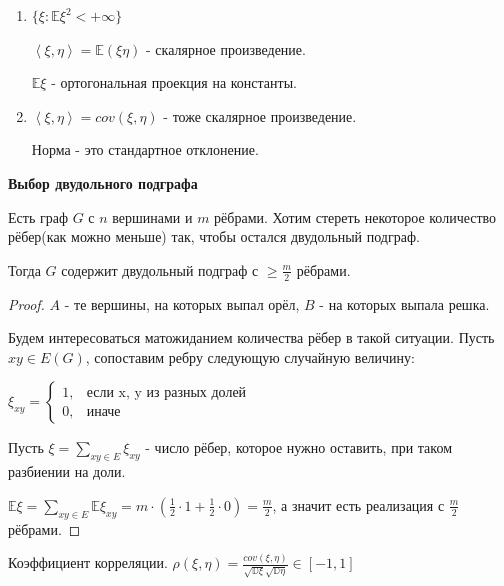 \begin{remark}
    \begin{enumerate}
        \item {
            $\{ \xi : \mathbb{E} \xi^2 < +\infty \}$

            $\left <\xi, \eta \right > = \mathbb{E} (\xi \eta)$ - скалярное произведение.

            $\mathbb{E} \xi$ - ортогональная проекция на константы.
        }
        \item {
            $\left < \xi, \eta \right > = cov (\xi, \eta)$ - тоже скалярное произведение.

            Норма - это стандартное отклонение.
        }
    \end{enumerate}
\end{remark}

\begin{theorem}
    \textbf{Выбор двудольного подграфа}

    Есть граф $G$ с $n$ вершинами и $m$ рёбрами. Хотим стереть некоторое количество рёбер(как можно меньше) так, чтобы
    остался двудольный подграф.

    Тогда $G$ содержит двудольный подграф с $\geqslant \frac{m}{2}$ рёбрами.
\end{theorem}

\begin{proof}
    $A$ - те вершины, на которых выпал орёл, $B$ - на которых выпала решка.

    Будем интересоваться матожиданием количества рёбер в такой ситуации. Пусть $xy \in E(G)$, сопоставим ребру 
    следующую случайную величину:

    $
    \xi_{xy} = 
    \begin{cases}
        1, & \text{если x, y из разных долей} \\
        0, & \text{иначе}
    \end{cases}
    $

    Пусть $\xi = \sum_{xy \in E} \xi_{xy}$ - число рёбер, которое нужно оставить, при таком разбиении на доли.

    $\mathbb{E} \xi = \sum_{xy \in E} \mathbb{E} \xi_{xy} = m \cdot (\frac{1}{2} \cdot 1 + \frac{1}{2} \cdot 0) = \frac{m}{2}$, а значит есть реализация с $\frac{m}{2}$ рёбрами.
\end{proof}

\begin{definition}
    Коэффициент корреляции. $\rho (\xi, \eta) = \frac{cov (\xi, \eta)}{\sqrt{\mathbb{D} \xi} \sqrt{\mathbb{D} \eta}} \in [-1, 1]$ 
\end{definition}

